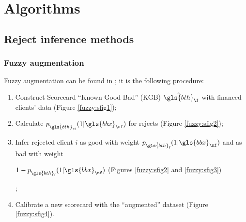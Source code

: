 
\chapter{Algorithms} \label{app1}

\minitoc

\section{Reject inference methods} \label{app1:reject}

\subsection{Fuzzy augmentation} \label{fuzzy}

Fuzzy augmentation can be found in \cite{economix}; it is the following procedure:
\begin{enumerate}
\item Construct Scorecard ``Known Good Bad'' (KGB) $\hat{\gls{bth}}_\f$ with financed clients' data (Figure \ref{fuzzy:sfig1});
\item Calculate $p_{\hat{\gls{bth}}_{\f}}(1|\gls{bbx}_{\nf})$ for rejects (Figure \ref{fuzzy:sfig2});
\item Infer rejected client $i$ as good with weight $p_{\hat{\gls{bth}}_{\text{f}}}(1|\gls{bbx}_{\nf})$ and as bad with weight {\begin{sloppypar} $1-p_{\hat{\gls{bth}}_{\text{f}}}(1|\gls{bbx}_{\nf})$ (Figures \ref{fuzzy:sfig2} and \ref{fuzzy:sfig3}) \end{sloppypar} };
\item Calibrate a new scorecard with the ``augmented'' dataset (Figure \ref{fuzzy:sfig4}).
\end{enumerate}

